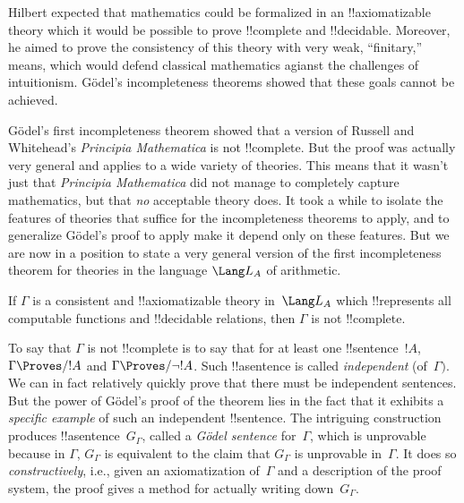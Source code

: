 \documentclass[../../../include/open-logic-section]{subfiles}
\begin{document}


Hilbert expected that mathematics could be formalized in an
!!{axiomatizable} theory which it would be possible to prove
!!{complete} and !!{decidable}. Moreover, he aimed to prove the
consistency of this theory with very weak, ``finitary,'' means, which
would defend classical mathematics agianst the challenges of
intuitionism.  G\"odel's incompleteness theorems showed that these
goals cannot be achieved.

G\"odel's first incompleteness theorem showed that a version of
Russell and Whitehead's \emph{Principia Mathematica} is not
!!{complete}.  But the proof was actually very general and applies to
a wide variety of theories.  This means that it wasn't just that
\emph{Principia Mathematica} did not manage to completely capture
mathematics, but that \emph{no} acceptable theory does.  It took a
while to isolate the features of theories that suffice for the
incompleteness theorems to apply, and to generalize G\"odel's proof to
apply make it depend only on these features.  But we are now in a
position to state a very general version of the first incompleteness
theorem for theories in the language $\Lang L_A$ of arithmetic.

\begin{thm}
If $\Gamma$ is a consistent and !!{axiomatizable} theory in~$\Lang
L_A$ which !!{represents} all computable functions and !!{decidable}
relations, then $\Gamma$ is not !!{complete}.
\end{thm}

To say that $\Gamma$ is not !!{complete} is to say that for at least
one !!{sentence}~$!A$, $\Gamma \Proves/ !A$ and $\Gamma \Proves/ \lnot
!A$.  Such !!a{sentence} is called \emph{independent} (of~$\Gamma)$.
We can in fact relatively quickly prove that there must be independent
sentences. But the power of G\"odel's proof of the theorem lies in the
fact that it exhibits a \emph{specific example} of such an independent
!!{sentence}. The intriguing construction produces
!!a{sentence}~$G_\Gamma$, called a \emph{G\"odel sentence}
for~$\Gamma$, which is unprovable because in $\Gamma$, $G_\Gamma$ is
equivalent to the claim that $G_\Gamma$ is unprovable in~$\Gamma$.  It
does so \emph{constructively}, i.e., given an axiomatization
of~$\Gamma$ and a description of the proof system, the proof gives a
method for actually writing down~$G_\Gamma$.
\end{document}

